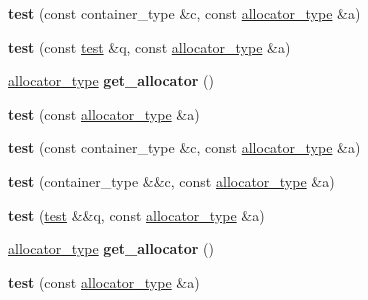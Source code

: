 \begin{DoxyCompactItemize}
\item 
\mbox{\label{structtest_a570b32b3abcc801ed80d0ebca4831bcf}} 
{\bfseries test} (const container\+\_\+type \&c, const \mbox{\hyperlink{classtest__allocator}{allocator\+\_\+type}} \&a)
\item 
\mbox{\label{structtest_a45659601f1451323c8a53cdb6a1c2a86}} 
{\bfseries test} (const \mbox{\hyperlink{structtest}{test}} \&q, const \mbox{\hyperlink{classtest__allocator}{allocator\+\_\+type}} \&a)
\item 
\mbox{\label{structtest_ac118a5169aefd32532363da721910981}} 
\mbox{\hyperlink{classtest__allocator}{allocator\+\_\+type}} {\bfseries get\+\_\+allocator} ()
\item 
\mbox{\label{structtest_a4ecc4aa80f049dc8824bfe0f4ec1bfcb}} 
{\bfseries test} (const \mbox{\hyperlink{classtest__allocator}{allocator\+\_\+type}} \&a)
\item 
\mbox{\label{structtest_a570b32b3abcc801ed80d0ebca4831bcf}} 
{\bfseries test} (const container\+\_\+type \&c, const \mbox{\hyperlink{classtest__allocator}{allocator\+\_\+type}} \&a)
\item 
\mbox{\label{structtest_aef6ed044b832639007cc1d24832f1270}} 
{\bfseries test} (container\+\_\+type \&\&c, const \mbox{\hyperlink{classtest__allocator}{allocator\+\_\+type}} \&a)
\item 
\mbox{\label{structtest_af196249915ea3bdf67539228ebab8fd6}} 
{\bfseries test} (\mbox{\hyperlink{structtest}{test}} \&\&q, const \mbox{\hyperlink{classtest__allocator}{allocator\+\_\+type}} \&a)
\item 
\mbox{\label{structtest_ac118a5169aefd32532363da721910981}} 
\mbox{\hyperlink{classtest__allocator}{allocator\+\_\+type}} {\bfseries get\+\_\+allocator} ()
\item 
\mbox{\label{structtest_a4ecc4aa80f049dc8824bfe0f4ec1bfcb}} 
{\bfseries test} (const \mbox{\hyperlink{classtest__allocator}{allocator\+\_\+type}} \&a)
\item 
\mbox{\label{structtest_a570b32b3abcc801ed80d0ebca4831bcf}} 

\end{DoxyCompactItemize}
